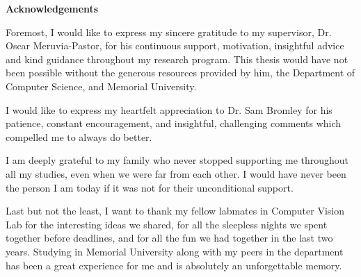 \begin{center}
\textbf{\large Acknowledgements}
\end{center}

\vspace{1cm}

Foremost, I would like to express my sincere gratitude to my supervisor, Dr. Oscar Meruvia-Pastor, for his continuous support, motivation, insightful advice and 
kind guidance throughout my research program. This 
thesis would have not been possible without the generous resources provided by him, the Department of Computer Science, and Memorial University.

I would like to express my heartfelt appreciation to Dr. Sam Bromley for his patience, constant encouragement, and insightful, challenging comments which compelled me to always
do better.

I am deeply grateful to my family who never stopped supporting me throughout all my studies, even when we were far from each other. I would have never been the person I am today if 
it was not for their unconditional support.

Last but not the least, I want to thank my fellow labmates in Computer Vision Lab for the interesting ideas we shared, for all the sleepless nights we spent together before deadlines, 
and for all the fun we had together in the last two years. Studying in Memorial University along with my peers in the department has been a great experience for me
and is absolutely an unforgettable memory.
